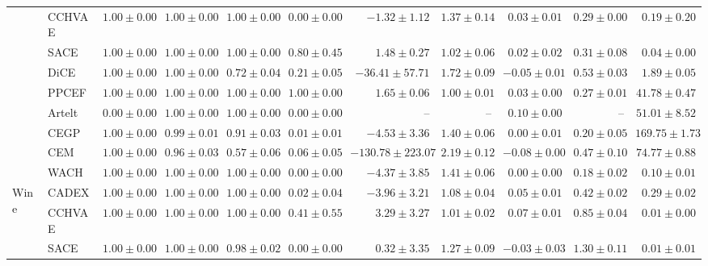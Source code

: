 \begin{table}[ht]
\begin{center}
\begin{sc}
\begin{scriptsize}
\begin{tabular}{l|l|rrrrrrrrr}
 & CCHVAE & $\boldsymbol{1.00\pm{0.00}}$ & $\boldsymbol{1.00\pm{0.00}}$ & $\boldsymbol{1.00\pm{0.00}}$ & $0.00\pm{0.00}$ & $-1.32\pm{1.12}$ & $1.37\pm{0.14}$ & $0.03\pm{0.01}$ & $0.29\pm{0.00}$ & $0.19\pm{0.20}$ \\
 & SACE & $\boldsymbol{1.00\pm{0.00}}$ & $\boldsymbol{1.00\pm{0.00}}$ & $\boldsymbol{1.00\pm{0.00}}$ & $0.80\pm{0.45}$ & $1.48\pm{0.27}$ & $1.02\pm{0.06}$ & $0.02\pm{0.02}$ & $0.31\pm{0.08}$ & $\boldsymbol{0.04\pm{0.00}}$ \\
 & DiCE & $\boldsymbol{1.00\pm{0.00}}$ & $\boldsymbol{1.00\pm{0.00}}$ & $0.72\pm{0.04}$ & $0.21\pm{0.05}$ & $-36.41\pm{57.71}$ & $1.72\pm{0.09}$ & $-0.05\pm{0.01}$ & $0.53\pm{0.03}$ & $1.89\pm{0.05}$ \\
 & PPCEF & $\boldsymbol{1.00\pm{0.00}}$ & $\boldsymbol{1.00\pm{0.00}}$ & $\boldsymbol{1.00\pm{0.00}}$ & $\boldsymbol{1.00\pm{0.00}}$ & $\boldsymbol{1.65\pm{0.06}}$ & $\boldsymbol{1.00\pm{0.01}}$ & $0.03\pm{0.00}$ & $0.27\pm{0.01}$ & $41.78\pm{0.47}$ \\
 & Artelt & $0.00\pm{0.00}$ & $\boldsymbol{1.00\pm{0.00}}$ & $\boldsymbol{1.00\pm{0.00}}$ & $0.00\pm{0.00}$ & -- & -- & $\boldsymbol{0.10\pm{0.00}}$ & -- & $51.01\pm{8.52}$ \\
 & CEGP & $\boldsymbol{1.00\pm{0.00}}$ & $0.99\pm{0.01}$ & $0.91\pm{0.03}$ & $0.01\pm{0.01}$ & $-4.53\pm{3.36}$ & $1.40\pm{0.06}$ & $0.00\pm{0.01}$ & $0.20\pm{0.05}$ & $169.75\pm{1.73}$ \\
 & CEM & $\boldsymbol{1.00\pm{0.00}}$ & $0.96\pm{0.03}$ & $0.57\pm{0.06}$ & $0.06\pm{0.05}$ & $-130.78\pm{223.07}$ & $2.19\pm{0.12}$ & $-0.08\pm{0.00}$ & $0.47\pm{0.10}$ & $74.77\pm{0.88}$ \\
 & WACH & $\boldsymbol{1.00\pm{0.00}}$ & $\boldsymbol{1.00\pm{0.00}}$ & $\boldsymbol{1.00\pm{0.00}}$ & $0.00\pm{0.00}$ & $-4.37\pm{3.85}$ & $1.41\pm{0.06}$ & $0.00\pm{0.00}$ & $0.18\pm{0.02}$ & $0.10\pm{0.01}$ \\
\midrule
\multirow{9}{*}{Wine} & CADEX & $\boldsymbol{1.00\pm{0.00}}$ & $\boldsymbol{1.00\pm{0.00}}$ & $\boldsymbol{1.00\pm{0.00}}$ & $0.02\pm{0.04}$ & $-3.96\pm{3.21}$ & $1.08\pm{0.04}$ & $0.05\pm{0.01}$ & $0.42\pm{0.02}$ & $0.29\pm{0.02}$ \\
 & CCHVAE & $\boldsymbol{1.00\pm{0.00}}$ & $\boldsymbol{1.00\pm{0.00}}$ & $\boldsymbol{1.00\pm{0.00}}$ & $0.41\pm{0.55}$ & $3.29\pm{3.27}$ & $1.01\pm{0.02}$ & $0.07\pm{0.01}$ & $0.85\pm{0.04}$ & $\boldsymbol{0.01\pm{0.00}}$ \\
 & SACE & $\boldsymbol{1.00\pm{0.00}}$ & $\boldsymbol{1.00\pm{0.00}}$ & $0.98\pm{0.02}$ & $0.00\pm{0.00}$ & $0.32\pm{3.35}$ & $1.27\pm{0.09}$ & $-0.03\pm{0.03}$ & $1.30\pm{0.11}$ & $\boldsymbol{0.01\pm{0.01}}$ \\

\end{tabular}
\end{scriptsize}
\end{sc}
\end{center}
\end{table}
